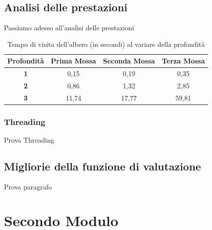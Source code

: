 \subsection{Analisi delle prestazioni}
Passiamo adesso all'analisi delle prestazioni

\begin{table}[]
    \centering
    \begin{tabular}{|c|c|c|c|}
\hline
\textbf{Profondità} & \textbf{Prima Mossa} & \textbf{Seconda Mossa} & \textbf{Terza Mossa}\\
\hline
\textbf{1} & 0,15 & 0,19 & 0,35\\
\hline
\textbf{2} & 0,86 & 1,32 & 2,85\\
\hline
\textbf{3} & 11,74 & 17,77 & 59,81\\
\hline
\end{tabular}
    \caption{Tempo di visita dell'albero (in secondi) al variare della profondità}
    \label{tab:my_label}
\end{table}

\subsubsection{Threading}
Prova Threading
\subsection{Migliorie della funzione di valutazione}
Prova paragrafo
\section{Secondo Modulo}
    
\newpage
